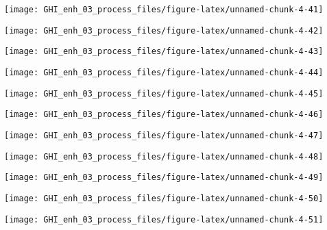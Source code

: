 \documentclass[
  10pt,
  a4paper,oneside]{article}
\begin{document}
\begin{center}\texttt{[image: GHI\_enh\_03\_process\_files/figure-latex/unnamed-chunk-4-41]} \end{center}

\begin{center}\texttt{[image: GHI\_enh\_03\_process\_files/figure-latex/unnamed-chunk-4-42]} \end{center}

\begin{center}\texttt{[image: GHI\_enh\_03\_process\_files/figure-latex/unnamed-chunk-4-43]} \end{center}

\begin{center}\texttt{[image: GHI\_enh\_03\_process\_files/figure-latex/unnamed-chunk-4-44]} \end{center}

\begin{center}\texttt{[image: GHI\_enh\_03\_process\_files/figure-latex/unnamed-chunk-4-45]} \end{center}

\begin{center}\texttt{[image: GHI\_enh\_03\_process\_files/figure-latex/unnamed-chunk-4-46]} \end{center}

\begin{center}\texttt{[image: GHI\_enh\_03\_process\_files/figure-latex/unnamed-chunk-4-47]} \end{center}

\begin{center}\texttt{[image: GHI\_enh\_03\_process\_files/figure-latex/unnamed-chunk-4-48]} \end{center}

\begin{center}\texttt{[image: GHI\_enh\_03\_process\_files/figure-latex/unnamed-chunk-4-49]} \end{center}

\begin{center}\texttt{[image: GHI\_enh\_03\_process\_files/figure-latex/unnamed-chunk-4-50]} \end{center}

\begin{center}\texttt{[image: GHI\_enh\_03\_process\_files/figure-latex/unnamed-chunk-4-51]} \end{center}
\end{document}
